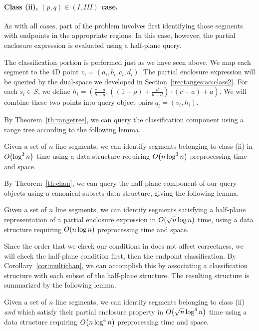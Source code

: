 \paragraph{Class (ii), $(p, q) \in (I, III)$ case.} 
As with all cases, part of the problem involves first identifying those segments with endpoints in the appropriate regions.
In this case, however, the partial enclosure expression is evaluated using a half-plane query.

The classification portion is performed just as we have seen above. We map each segment to the 4D point $v_i = ( a_i, b_i, c_i, d_i )$. The partial enclosure expression will be queried by the dual-space we developed in Section~\ref{:rectanges:ao:class2}. For each $s_i \in S$, we define $h_i = \left ( \frac{c - a}{b - d}, \left ( (1 - \rho) + \frac{d}{b-d} \right ) \cdot (c-a) + a \right )$.  We will combine these two points into query object pairs $q_i = (v_i, h_i)$.

By Theorem~\ref{th:rangetree}, we can query the classification component using a range tree according to the following lemma.
\begin{lemma}
\label{lem:ao:class2:v}
Given a set of $n$ line segments, we can identify segments belonging to class (ii) in $O\!\left(\log^3{n}\right)$ time using a data structure requiring $O\!\left(n\log^3{n}\right)$ preprocessing time and space.
\end{lemma}

By Theorem~\ref{th:chan}, we can query the half-plane component of our query objects using a canonical subsets data structure, giving the following lemma.

\begin{lemma}
\label{lem:ao:class2:h}
Given a set of $n$ line segments, we can identify segments satisfying a half-plane representation of a partial enclosure expression in $O\!\left(\sqrt{n}\log{n}\right)$ time, using a data structure requiring $O\!\left(n\log{n}\right)$ preprocessing time and space.
\end{lemma}

Since the order that we check our conditions in does not affect correctness, we will check the half-plane condition first, then the endpoint classification.  
By Corollary~\ref{cor:multichan}, we can accomplish this by associating a classification structure with each subset of the half-plane structure. The resulting structure is summarized by the following lemma.

\begin{lemma}
\label{lem:ao:class2:c}
Given a set of $n$ line segments, we can identify segments belonging to class (ii) \emph{and} which satisfy their partial enclosure property in $O\!\left(\sqrt{n}\log^4{n}\right)$ time using a data structure requiring $O\!\left(n\log^4{n}\right)$ preprocessing time and space.
\end{lemma}


